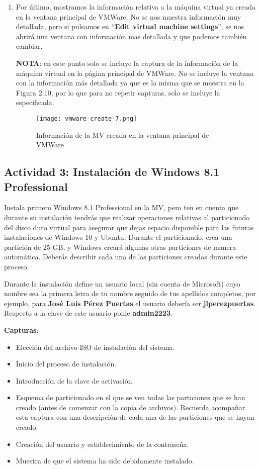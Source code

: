 \begin{enumerate}
    \item Por último, mostramos la información relativa a la máquina virtual ya creada en la ventana principal de VMWare. No se nos muestra información muy detallada, pero si pulsamos en ``\textbf{Edit virtual machine settings}'', se nos abrirá una ventana con información mas detallada y que podemos también cambiar.

    \textbf{NOTA}: en este punto solo se incluye la captura de la información de la máquina virtual en la página principal de VMWare. No se incluye la ventana con la información más detallada ya que es la misma que se muestra en la Figura 2.10, por lo que para no repetir capturas, solo se incluye la especificada.

    \begin{figure}[H]
        \centering
        \texttt{[image: vmware-create-7.png]}
        \caption{Información de la MV creada en la ventana principal de VMWare}
    \end{figure}
\end{enumerate}

\subsection{Actividad 3: Instalación de Windows 8.1 Professional}
Instala primero Windows 8.1 Professional en la MV, pero ten en cuenta que durante su instalación tendrás que realizar operaciones relativas al particionado del disco duro virtual para asegurar que dejas espacio disponible para las futuras instalaciones de Windows 10 y Ubuntu. Durante el particionado, crea una partición de 25 GB, y Windows creará algunas otras particiones de manera automática. Deberás describir cada una de las particiones creadas durante este proceso.

Durante la instalación define un usuario local (sin cuenta de Microsoft) cuyo nombre sea la primera letra de tu nombre seguido de tus apellidos completos, por ejemplo, para \textbf{José Luis Pérez Puertas} el usuario debería ser \textbf{\textbf{jlperezpuertas}}. Respecto a la clave de este usuario ponle \textbf{admin2223}.

\textbf{Capturas}:

\begin{itemize}
    \item Elección del archivo ISO de instalación del sistema.
    \item Inicio del proceso de instalación.
    \item Introducción de la clave de activación.
    \item Esquema de particionado en el que se ven todas las particiones que se han creado (antes de comenzar con la copia de archivos). Recuerda acompañar esta captura con una descripción de cada una de las particiones que se hayan creado.
    \item Creación del usuario y establecimiento de la contraseña.
    \item Muestra de que el sistema ha sido debidamente instalado.
\end{itemize}

